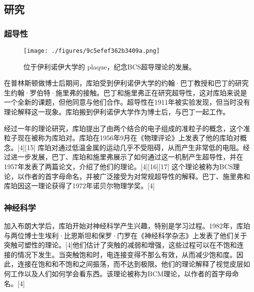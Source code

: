 \subsection{研究}
\subsubsection{超导性}
\begin{figure}[ht]
\centering
\texttt{[image: ./figures/9c5efef362b3409a.png]}
\caption{位于伊利诺伊大学的 plaque，纪念BCS超导理论的发展。} \label{fig_LAkb_2}
\end{figure}
在普林斯顿做博士后期间，库珀受到伊利诺伊大学的约翰·巴丁教授和巴丁的研究生约翰·罗伯特·施里弗的接触。巴丁和施里弗正在研究超导性，这对库珀来说是一个全新的课题，但他同意与他们合作。超导性在1911年被实验发现，但当时没有理论解释这一现象。库珀搬到伊利诺伊大学作为博士后，与巴丁一起工作。

经过一年的理论研究，库珀提出了由两个结合的电子组成的准粒子的概念，这个准粒子现在被称为库珀对。库珀在1956年9月在《物理评论》上发表了他的库珀对概念。[4][15] 库珀对通过低温金属的运动几乎不受阻碍，从而产生非常低的电阻。经过进一步发展，巴丁、库珀和施里弗展示了如何通过这一机制产生超导性，并在1957年发表了两篇论文，介绍了他们的理论。[4][16][17] 这个理论被称为BCS理论，以作者的首字母命名，并被广泛接受为对常规超导性的解释。巴丁、施里弗和库珀因这一理论获得了1972年诺贝尔物理学奖。[4]
\subsubsection{神经科学}
加入布朗大学后，库珀开始对神经科学产生兴趣，特别是学习过程。1982年，库珀与两位博士生埃利·比恩斯坦和保罗·门罗在《神经科学杂志》上发表了他们关于突触可塑性的理论。[4]他们估计了突触的减弱和增强，这些过程可以在不饱和连接的情况下发生。当突触饱和时，电连接变得不那么有效，从而减少饱和度。因此，连接在饱和和不饱和之间振荡，而不达到极限。他们的理论解释了视觉皮层如何工作以及人们如何学会看东西。该理论被称为BCM理论，以作者的首字母命名。[4]
